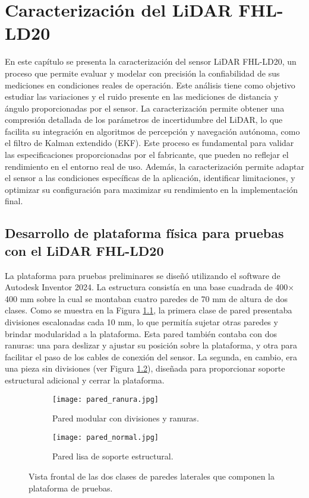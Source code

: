 \chapter{Caracterización del LiDAR FHL-LD20}
En este capítulo se presenta la caracterización del sensor LiDAR FHL-LD20, un proceso que permite evaluar y modelar con precisión la confiabilidad de sus mediciones en condiciones reales de operación. Este análisis tiene como objetivo estudiar las variaciones y el ruido presente en las mediciones de distancia y ángulo proporcionadas por el sensor. La caracterización permite obtener una compresión detallada de los parámetros de incertidumbre del LiDAR, lo que facilita su integración en algoritmos de percepción y navegación autónoma, como el filtro de Kalman extendido (EKF). Este proceso es fundamental para validar las especificaciones proporcionadas por el fabricante, que pueden no reflejar el rendimiento en el entorno real de uso. Además, la caracterización permite adaptar el sensor a las condiciones específicas de la aplicación, identificar limitaciones, y optimizar su configuración para maximizar su rendimiento en la implementación final.

\section{Desarrollo de plataforma física para pruebas con el LiDAR FHL-LD20}
La plataforma para pruebas preliminares se diseñó utilizando el software de Autodesk Inventor 2024. La estructura consistía en una base cuadrada de 400$\times$400 mm sobre la cual se montaban cuatro paredes de 70 mm de altura de dos clases. Como se muestra en la Figura \ref{fig:pared_ranura}, la primera clase de pared presentaba divisiones escalonadas cada 10 mm, lo que permitía sujetar otras paredes y brindar modularidad a la plataforma. Esta pared también contaba con dos ranuras: una para deslizar y ajustar su posición sobre la plataforma, y otra para facilitar el paso de los cables de conexión del sensor. La segunda, en cambio, era una pieza sin divisiones (ver Figura \ref{fig:pared_normal}), diseñada para proporcionar soporte estructural adicional y cerrar la plataforma.

\begin{figure}[H]
	\centering
	\begin{subfigure}{0.5\textwidth}
		\centering	
		\texttt{[image: pared\_ranura.jpg]}
		\caption{Pared modular con divisiones y ranuras.}
		\label{fig:pared_ranura}
	\end{subfigure}%
	\begin{subfigure}{0.5\textwidth}
		\centering
		\texttt{[image: pared\_normal.jpg]}
		\caption{Pared lisa de soporte estructural.}
		\label{fig:pared_normal}
	\end{subfigure}
	
	\caption{Vista frontal de las dos clases de paredes laterales que componen la plataforma de pruebas.}
	\label{fig:pared}
\end{figure}

